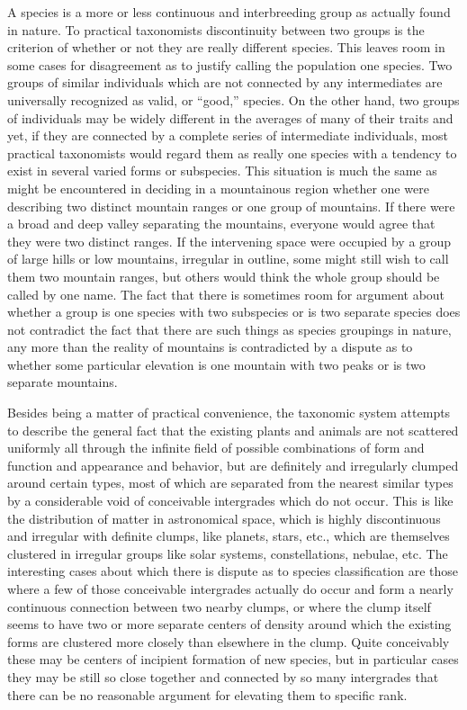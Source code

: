 A species is a more or less continuous and interbreeding group as
actually found in nature. To practical taxonomists discontinuity
between two groups is the criterion of whether or not they are really
different species. This leaves room in some cases for disagreement as to
justify calling the population one species. Two groups of similar individuals
which are not connected by any intermediates are universally
recognized as valid, or ``good,'' species. On the other hand, two groups
of individuals may be widely different in the averages of many of their
traits and yet, if they are connected by a complete series of intermediate
individuals, most practical taxonomists would regard them as really one
species with a tendency to exist in several varied forms or subspecies.
This situation is much the same as might be encountered in deciding in
a mountainous region whether one were describing two distinct mountain
ranges or one group of mountains. If there were a broad and deep
valley separating the mountains, everyone would agree that they were
two distinct ranges. If the intervening space were occupied by a group
of large hills or low mountains, irregular in outline, some might still
wish to call them two mountain ranges, but others would think the
whole group should be called by one name. The fact that there is sometimes
room for argument about whether a group is one species with two
subspecies or is two separate species does not contradict the fact that
there are such things as species groupings in nature, any more than the
reality of mountains is contradicted by a dispute as to whether some
particular elevation is one mountain with two peaks or is two separate
mountains.

Besides being a matter of practical convenience, the taxonomic system
attempts to describe the general fact that the existing plants and
animals are not scattered uniformly all through the infinite field of possible
combinations of form and function and appearance and behavior,
but are definitely and irregularly clumped around certain types, most of
which are separated from the nearest similar types by a considerable
void of conceivable intergrades which do not occur. This is like the distribution
of matter in astronomical space, which is highly discontinuous
and irregular with definite clumps, like planets, stars, etc., which
are themselves clustered in irregular groups like solar systems, constellations,
nebulae, etc. The interesting cases about which there is dispute as
to species classification are those where a few of those conceivable intergrades
actually do occur and form a nearly continuous connection
between two nearby clumps, or where the clump itself seems to have
two or more separate centers of density around which the existing forms
are clustered more closely than elsewhere in the clump. Quite conceivably
these may be centers of incipient formation of new species, but in
particular cases they may be still so close together and connected by so
many intergrades that there can be no reasonable argument for elevating
them to specific rank.

